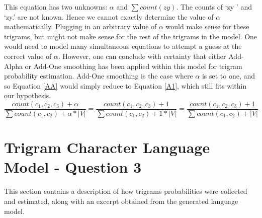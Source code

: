 \documentclass[12pt]{article}
\begin{document}
This equation has two unknowns:  $\alpha$ and $\sum count(zy)$. The counts of `zy ' and `zy.' are not known. Hence we cannot exactly determine the value of $\alpha$ mathematically.  Plugging in an arbitrary value of $\alpha$ would make sense for these trigrams, but might not make sense for the rest of the trigrams in the model.  One would need to model many simultaneous equations to attempt a guess at the correct value of $\alpha$.  However, one can conclude with certainty that either Add-Alpha or Add-One smoothing has been applied within this model for trigram probability estimation. Add-One smoothing is the case where $\alpha$ is set to one, and so Equation \ref{AA} would simply reduce to Equation \ref{A1}, which still fits within our hypothesis.
\begin{equation}\label{A1}
 \dfrac{{count(c_{1},c_{2},c_{3})} + \alpha} {\sum count(c_1,c_2)+ \alpha * |V|} = \dfrac{{count(c_{1},c_{2},c_{3})} + 1} {\sum count(c_1,c_2)+ 1 * |V|}  = \dfrac{{count(c_{1},c_{2},c_{3})} + 1} {\sum count(c_1,c_2)+  |V|}
\end{equation}
\section{Trigram Character Language Model - Question 3}
This section contains a description of how trigrams probabilities were collected and estimated, along with an excerpt obtained from the generated language model.
\end{document}
